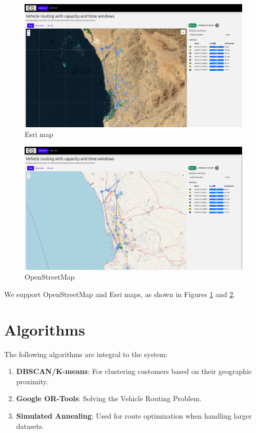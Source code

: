 \documentclass[a4paper,12pt, final]{article}
\begin{document}
\begin{figure}[H]
    \centering
    \includegraphics[width=\textwidth]{gfx/VRP_6.png}
    \caption{Esri map}
    \label{fig:VRP_6}
\end{figure}

\begin{figure}[H]
    \centering
    \includegraphics[width=\textwidth]{gfx/VRP_7.png}
    \caption{OpenStreetMap}
    \label{fig:VRP_7}
\end{figure}

We support OpenStreetMap and Esri maps, as shown in Figures \ref{fig:VRP_6} and \ref{fig:VRP_7}.
\newpage

\section{Algorithms}
The following algorithms are integral to the system:
\begin{enumerate}
    \item \textbf{DBSCAN/K-means}: For clustering customers based on their geographic proximity.
    \item \textbf{Google OR-Tools}: Solving the Vehicle Routing Problem.
    \item \textbf{Simulated Annealing}: Used for route optimization when handling larger datasets.
\end{enumerate}
\end{document}
